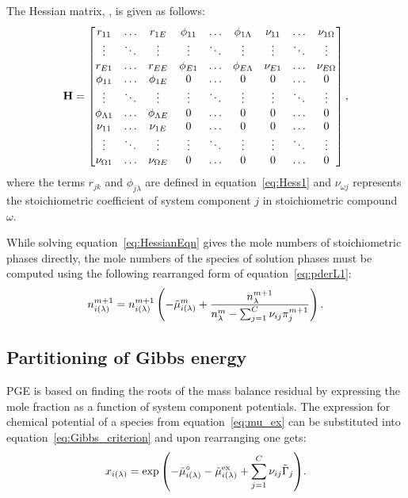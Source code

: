The Hessian matrix, \Hessian, is given as follows:
\begin{equation}\label{eq:GEM_mat}
\mathbf{H} =
    \begin{bmatrix}
      r_{11} & \dots & r_{1E} & \phi_{11} & \dots & \phi_{1\Lambda} & \nu_{11} & \dots & \nu_{1\Omega} \\
      \vdots & \ddots & \vdots & \vdots & \ddots & \vdots & \vdots & \ddots & \vdots \\
      r_{E1} & \dots & r_{EE} & \phi_{E1} & \dots & \phi_{E\Lambda} & \nu_{E1} & \dots & \nu_{E\Omega} \\
      \phi_{11} & \dots & \phi_{1E} & 0 & \dots & 0 & 0 & \dots & 0 \\
      \vdots & \ddots & \vdots & \vdots & \ddots & \vdots & \vdots & \ddots & \vdots \\
      \phi_{\Lambda1} & \dots & \phi_{\Lambda E} & 0 & \dots & 0 & 0 & \dots & 0 \\
      \nu_{11} & \dots & \nu_{1E} & 0 & \dots & 0 & 0 & \dots & 0 \\
      \vdots & \ddots & \vdots & \vdots & \ddots & \vdots & \vdots & \ddots & \vdots \\
      \nu_{\Omega 1} & \dots & \nu_{\Omega E} & 0 & \dots & 0 & 0 & \dots & 0 \\
    \end{bmatrix},
\end{equation}
where the terms $r_{jk}$ and $\phi_{j\lambda}$ are defined in equation~\eqref{eq:Hess1} and $\nu_{\omega j}$ represents the stoichiometric coefficient of system component $j$ in stoichiometric compound $\omega$.

While solving equation~\eqref{eq:HessianEqn} gives the mole numbers of stoichiometric phases directly, the mole numbers of the species of solution phases must be computed using the following rearranged form of equation~\eqref{eq:pderL1}:
\begin{equation}
  n_{i(\lambda)}^{m+1} = n_{i(\lambda)}^{m+1}\left(-\tilde{\mu}_{i(\lambda)}^m + \frac{n_\lambda^{m+1}}{n_\lambda^{m} - \sum_{j = 1}^{C}\nu_{ij} \pi_j^{m+1}}\right).
\end{equation}

\subsection{Partitioning of Gibbs energy}
PGE is based on finding the roots of the mass balance residual by expressing the mole fraction as a function of system component potentials. The expression for chemical potential of a species from equation~\eqref{eq:mu_ex} can be substituted into equation~\eqref{eq:Gibbs_criterion} and upon rearranging one gets:
    \begin{equation}
        x_{i(\lambda)} = \exp{\left(-\ensuremath{\tilde{\mu}_{i(\lambda)}^{\circ}} - \ensuremath{\tilde{\mu}_{i(\lambda)}^\text{ex}} +  \ensuremath{\sum_{j = 1}^{C}} \ensuremath{\nu_{ij}} \ensuremath{\tilde{\Gamma}_{j}}\right)}.
    \end{equation}

